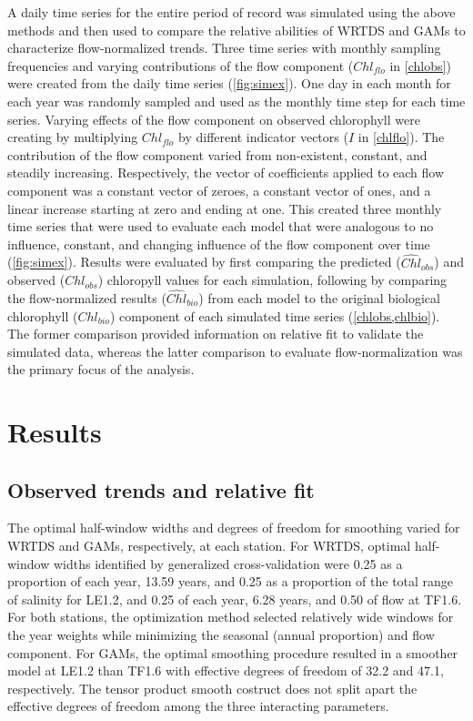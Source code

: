 \documentclass[letterpaper,12pt,oneside]{article}\usepackage[]{graphicx}\usepackage[]{color}
\begin{document}
A daily time series for the entire period of record was simulated using the above methods and then used to compare the relative abilities of \ac{WRTDS} and \acp{GAM} to characterize flow-normalized trends.  Three time series with monthly sampling frequencies and varying contributions of the flow component ($Chl_{flo}$ in \cref{chlobs}) were created from the daily time series (\cref{fig:simex}). One day in each month for each year was randomly sampled and used as the monthly time step for each time series.  Varying effects of the flow component on observed chlorophyll were creating by multiplying $Chl_{flo}$ by different indicator vectors ($I$ in \cref{chlflo}).  The contribution of the flow component varied from non-existent, constant, and steadily increasing.  Respectively, the vector of coefficients applied to each flow component was a constant vector of zeroes, a constant vector of ones, and a linear increase starting at zero and ending at one.  This created three monthly time series that were used to evaluate each model that were analogous to no influence, constant, and changing influence of the flow component over time (\cref{fig:simex}).  Results were evaluated by first comparing the predicted ($\widehat{Chl}_{obs}$) and observed ($Chl_{obs}$) chloropyll values for each simulation, following by comparing the flow-normalized results ($\widehat{Chl}_{bio}$) from each model to the original biological chlorophyll ($Chl_{bio}$) component of each simulated time series (\cref{chlobs,chlbio}).  The former comparison provided information on relative fit to validate the simulated data, whereas the latter comparison to evaluate flow-normalization was the primary focus of the analysis.

\section{Results}

\subsection{Observed trends and relative fit}



The optimal half-window widths and degrees of freedom for smoothing varied for \ac{WRTDS} and \acp{GAM}, respectively, at each station.  For \ac{WRTDS}, optimal half-window widths identified by generalized cross-validation were  0.25 as a proportion of each year, 13.59 years, and  0.25 as a proportion of the total range of salinity for LE1.2, and 0.25 of each year, 6.28 years, and 0.50 of flow at TF1.6.  For both stations, the optimization method selected relatively wide windows for the year weights while minimizing the seasonal (annual proportion) and flow component.  For \acp{GAM}, the optimal smoothing procedure resulted in a smoother model at LE1.2 than TF1.6 with effective degrees of freedom of 32.2 and 47.1, respectively.  The tensor product smooth costruct does not split apart the effective degrees of freedom among the three interacting parameters.     
\end{document}
